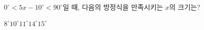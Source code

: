 $0^\circ<5x-10^\circ<90^\circ$일 때, 다음의 방정식을 만족시키는 $x$의 크기는?
\begin{choices32}{$8^\circ$}{$10^\circ$}{$11^\circ$}{$14^\circ$}{$15^\circ$}\end{choices32}
